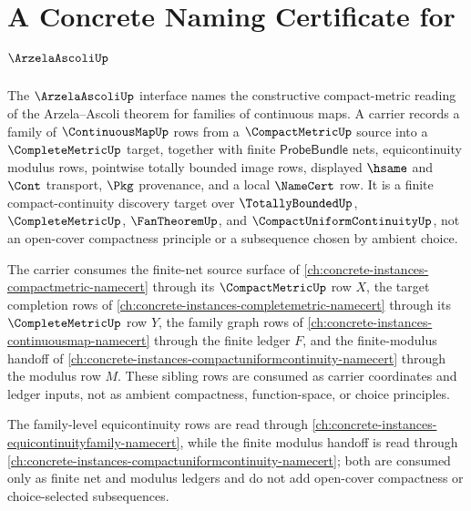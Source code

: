 \chapter{A Concrete Naming Certificate for $\ArzelaAscoliUp$}
\label{ch:concrete-instances-arzelaascoli-namecert}

The $\ArzelaAscoliUp$ interface names the constructive compact-metric reading of the Arzela--Ascoli theorem for families of continuous maps. A carrier records a family of $\ContinuousMapUp$ rows from a $\CompactMetricUp$ source into a $\CompleteMetricUp$ target, together with finite $\mathsf{ProbeBundle}$ nets, equicontinuity modulus rows, pointwise totally bounded image rows, displayed $\hsame$ and $\Cont$ transport, $\Pkg$ provenance, and a local $\NameCert$ row. It is a finite compact-continuity discovery target over $\TotallyBoundedUp$, $\CompleteMetricUp$, $\FanTheoremUp$, and $\CompactUniformContinuityUp$, not an open-cover compactness principle or a subsequence chosen by ambient choice.

The carrier consumes the finite-net source surface of \autoref{ch:concrete-instances-compactmetric-namecert} through its $\CompactMetricUp$ row $X$, the target completion rows of \autoref{ch:concrete-instances-completemetric-namecert} through its $\CompleteMetricUp$ row $Y$, the family graph rows of \autoref{ch:concrete-instances-continuousmap-namecert} through the finite ledger $F$, and the finite-modulus handoff of \autoref{ch:concrete-instances-compactuniformcontinuity-namecert} through the modulus row $M$. These sibling rows are consumed as carrier coordinates and ledger inputs, not as ambient compactness, function-space, or choice principles.

The family-level equicontinuity rows are read through \autoref{ch:concrete-instances-equicontinuityfamily-namecert}, while the finite modulus handoff is read through \autoref{ch:concrete-instances-compactuniformcontinuity-namecert}; both are consumed only as finite net and modulus ledgers and do not add open-cover compactness or choice-selected subsequences.

